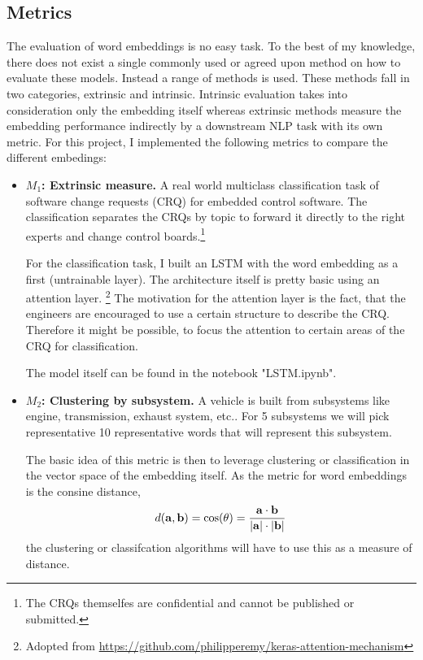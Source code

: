 \documentclass[10pt,a4paper]{article}
\begin{document}
	\subsection{Metrics}
	\label{eval}
	The evaluation of word embeddings is no easy task. To the best of my knowledge, there does not exist a single commonly used or agreed upon method on how to evaluate these models\cite{1901.09785, Schnabel15, 1801.09536}. Instead a range of methods is used. These methods fall in two categories, extrinsic and intrinsic. Intrinsic evaluation takes into consideration only the embedding itself whereas extrinsic methods measure the embedding performance indirectly by a downstream NLP task with its own metric. For this project, I implemented the following metrics to compare the different embedings:
	
	\begin{itemize}
		\item \textbf{$M_1$: Extrinsic measure.} A real world multiclass classification task of software change requests (CRQ) for embedded control software. The classification separates the CRQs by topic to forward it directly to the right experts and change control boards.\footnote{The CRQs themselfes are confidential and cannot be published or submitted.}  
		
		For the classification task, I built an LSTM with the word embedding as a first (untrainable layer). The architecture itself is pretty basic using an attention layer. \footnote{ Adopted from \url{https://github.com/philipperemy/keras-attention-mechanism}}
		The motivation for the attention layer is the fact, that the engineers are encouraged to use a certain structure to describe the CRQ. Therefore it might be possible, to focus the attention to certain areas of the CRQ for classification. 
		
		The model itself can be found in the notebook "LSTM.ipynb".
		
		\item \textbf{$M_2$: Clustering by subsystem.} A vehicle is built from subsystems like engine, transmission, exhaust system, etc.. For 5 subsystems we will pick representative 10 representative words that will represent this subsystem. 
		
		The basic idea of this metric is then to leverage clustering or classification in the vector space of the embedding itself. As the metric for word embeddings is the consine distance, 
		\begin{equation}
		d(\bold{a}, \bold{b})=\cos(\theta)=\frac{\bold{a} \cdot \bold{b}}{|\bold{a}|\cdot|\bold{b}|}
		\end{equation}
		the clustering or classifcation algorithms will have to use this as a measure of distance.
		

\end{itemize}
\end{document}
